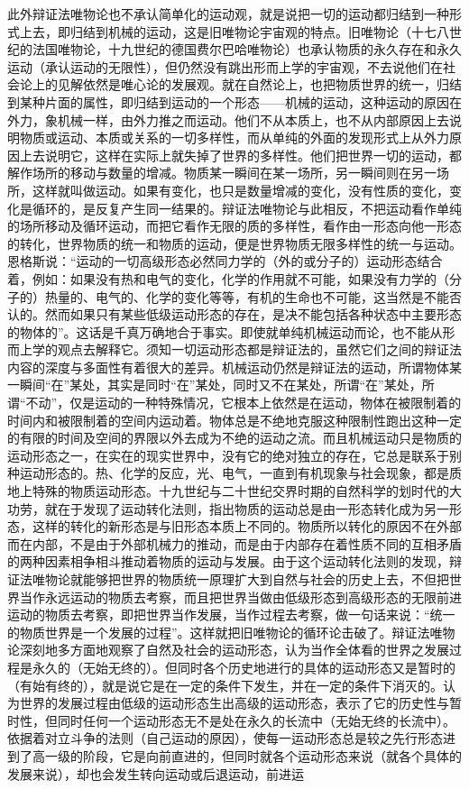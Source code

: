 \documentclass[UTF8, 12pt, a4paper]{ctexrep}
\begin{document}
此外辩证法唯物论也不承认简单化的运动观，就是说把一切的运动都归结到一种形式上去，即归结到机械的运动，这是旧唯物论宇宙观的特点。旧唯物论（十七八世纪的法国唯物论，十九世纪的德国费尔巴哈唯物论）也承认物质的永久存在和永久运动（承认运动的无限性），但仍然没有跳出形而上学的宇宙观，不去说他们在社会论上的见解依然是唯心论的发展观。就在自然论上，也把物质世界的统一，归结到某种片面的属性，即归结到运动的一个形态——机械的运动，这种运动的原因在外力，象机械一样，由外力推之而运动。他们不从本质上，也不从内部原因上去说明物质或运动、本质或关系的一切多样性，而从单纯的外面的发现形式上从外力原因上去说明它，这样在实际上就失掉了世界的多样性。他们把世界一切的运动，都解作场所的移动与数量的增减。物质某一瞬间在某一场所，另一瞬间则在另一场所，这样就叫做运动。如果有变化，也只是数量增减的变化，没有性质的变化，变化是循环的，是反复产生同一结果的。辩证法唯物论与此相反，不把运动看作单纯的场所移动及循环运动，而把它看作无限的质的多样性，看作由一形态向他一形态的转化，世界物质的统一和物质的运动，便是世界物质无限多样性的统一与运动。恩格斯说：“运动的一切高级形态必然同力学的（外的或分子的）运动形态结合着，例如：如果没有热和电气的变化，化学的作用就不可能，如果没有力学的（分子的）热量的、电气的、化学的变化等等，有机的生命也不可能，这当然是不能否认的。然而如果只有某些低级运动形态的存在，是决不能包括各种状态中主要形态的物体的”。这话是千真万确地合于事实。即使就单纯机械运动而论，也不能从形而上学的观点去解释它。须知一切运动形态都是辩证法的，虽然它们之间的辩证法内容的深度与多面性有着很大的差异。机械运动仍然是辩证法的运动，所谓物体某一瞬间“在”某处，其实是同时“在”某处，同时又不在某处，所谓“在”某处，所谓“不动”，仅是运动的一种特殊情况，它根本上依然是在运动，物体在被限制着的时间内和被限制着的空间内运动着。物体总是不绝地克服这种限制性跑出这种一定的有限的时间及空间的界限以外去成为不绝的运动之流。而且机械运动只是物质的运动形态之一，在实在的现实世界中，没有它的绝对独立的存在，它总是联系于别种运动形态的。热、化学的反应，光、电气，一直到有机现象与社会现象，都是质地上特殊的物质运动形态。十九世纪与二十世纪交界时期的自然科学的划时代的大功劳，就在于发现了运动转化法则，指出物质的运动总是由一形态转化成为另一形态，这样的转化的新形态是与旧形态本质上不同的。物质所以转化的原因不在外部而在内部，不是由于外部机械力的推动，而是由于内部存在着性质不同的互相矛盾的两种因素相争相斗推动着物质的运动与发展。由于这个运动转化法则的发现，辩证法唯物论就能够把世界的物质统一原理扩大到自然与社会的历史上去，不但把世界当作永远运动的物质去考察，而且把世界当做由低级形态到高级形态的无限前进运动的物质去考察，即把世界当作发展，当作过程去考察，做一句话来说：“统一的物质世界是一个发展的过程”。这样就把旧唯物论的循环论击破了。辩证法唯物论深刻地多方面地观察了自然及社会的运动形态，认为当作全体看的世界之发展过程是永久的（无始无终的）。但同时各个历史地进行的具体的运动形态又是暂时的（有始有终的），就是说它是在一定的条件下发生，并在一定的条件下消灭的。认为世界的发展过程由低级的运动形态生出高级的运动形态，表示了它的历史性与暂时性，但同时任何一个运动形态无不是处在永久的长流中（无始无终的长流中）。依据着对立斗争的法则（自己运动的原因），使每一运动形态总是较之先行形态进到了高一级的阶段，它是向前直进的，但同时就各个运动形态来说（就各个具体的发展来说），却也会发生转向运动或后退运动，前进运
\end{document}
